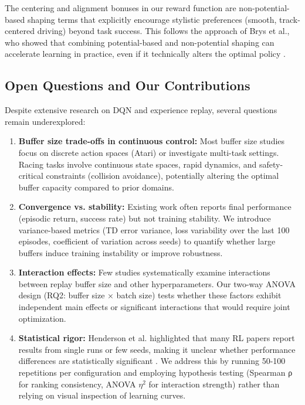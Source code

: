 The centering and alignment bonuses in our reward function are non-potential-based shaping terms that explicitly encourage stylistic preferences (smooth, track-centered driving) beyond task success. This follows the approach of Brys et al., who showed that combining potential-based and non-potential shaping can accelerate learning in practice, even if it technically alters the optimal policy \cite{brys2015reinforcement}.

\subsection{Open Questions and Our Contributions}

Despite extensive research on DQN and experience replay, several questions remain underexplored:

\begin{enumerate}
    \item \textbf{Buffer size trade-offs in continuous control:} Most buffer size studies focus on discrete action spaces (Atari) or investigate multi-task settings. Racing tasks involve continuous state spaces, rapid dynamics, and safety-critical constraints (collision avoidance), potentially altering the optimal buffer capacity compared to prior domains.
    
    \item \textbf{Convergence vs. stability:} Existing work often reports final performance (episodic return, success rate) but not training stability. We introduce variance-based metrics (TD error variance, loss variability over the last 100 episodes, coefficient of variation across seeds) to quantify whether large buffers induce training instability or improve robustness.
    
    \item \textbf{Interaction effects:} Few studies systematically examine interactions between replay buffer size and other hyperparameters. Our two-way ANOVA design (RQ2: buffer size × batch size) tests whether these factors exhibit independent main effects or significant interactions that would require joint optimization.
    
    \item \textbf{Statistical rigor:} Henderson et al. highlighted that many RL papers report results from single runs or few seeds, making it unclear whether performance differences are statistically significant \cite{henderson2018deep}. We address this by running 50-100 repetitions per configuration and employing hypothesis testing (Spearman ρ for ranking consistency, ANOVA $\eta^2$ for interaction strength) rather than relying on visual inspection of learning curves.
\end{enumerate}

